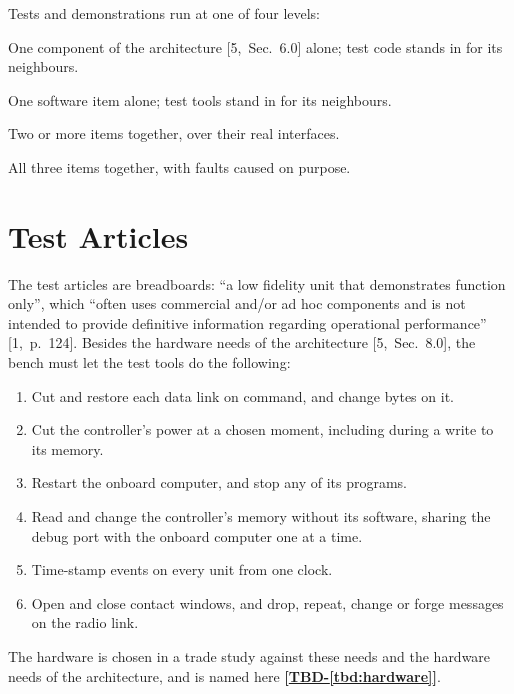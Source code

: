 \documentclass[11pt,a4paper]{article}
\newcommand{\tbd}[1]{\mbox{\textbf{[\hyperref[tbd:#1]{TBD-\ref*{tbd:#1}}]}}}
\begin{document}
\noindent Tests and demonstrations run at one of four levels:

\begin{description}[leftmargin=3.8cm]
\item[COMPONENT] One component of the architecture [5,~Sec.~6.0] alone; test
  code stands in for its neighbours.
\item[ITEM] One software item alone; test tools stand in for its neighbours.
\item[INTEGRATION] Two or more items together, over their real interfaces.
\item[SYSTEM] All three items together, with faults caused on purpose.
\end{description}

\section{Test Articles}
The test articles are breadboards: ``a low fidelity unit that demonstrates
function only'', which ``often uses commercial and/or ad hoc components and is
not intended to provide definitive information regarding operational
performance'' [1,~p.~124]. Besides the hardware needs of the architecture
[5,~Sec.~8.0], the bench must let the test tools do the following:

\begin{enumerate}
\item Cut and restore each data link on command, and change bytes on it.
\item Cut the controller's power at a chosen moment, including during a write
  to its memory.
\item Restart the onboard computer, and stop any of its programs.
\item Read and change the controller's memory without its software, sharing
  the debug port with the onboard computer one at a time.
\item Time-stamp events on every unit from one clock.
\item Open and close contact windows, and drop, repeat, change or forge
  messages on the radio link.
\end{enumerate}

\noindent The hardware is chosen in a trade study against these needs and the
hardware needs of the architecture, and is named here \tbd{hardware}.

\end{document}
